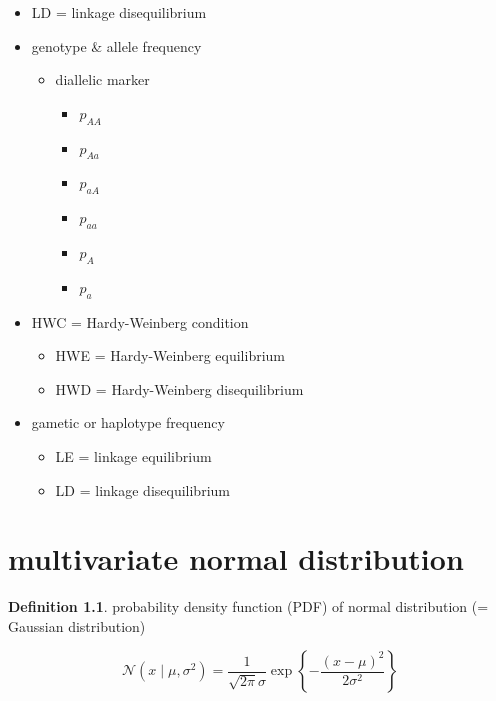 \documentclass[
]{book}
\providecommand{\tightlist}{%
  \setlength{\itemsep}{0pt}\setlength{\parskip}{0pt}}
\theoremstyle{definition}
\newtheorem{definition}{Definition}[chapter]
\theoremstyle{definition}
\theoremstyle{definition}
\theoremstyle{definition}
\theoremstyle{remark}
\begin{document}
\begin{itemize}
\tightlist
\item
  LD = linkage disequilibrium
\item
  genotype \& allele frequency

  \begin{itemize}
  \tightlist
  \item
    diallelic marker

    \begin{itemize}
    \tightlist
    \item
      \(p_{AA}\)
    \item
      \(p_{Aa}\)
    \item
      \(p_{aA}\)
    \item
      \(p_{aa}\)
    \item
      \(p_{A}\)
    \item
      \(p_{a}\)
    \end{itemize}
  \end{itemize}
\item
  HWC = Hardy-Weinberg condition

  \begin{itemize}
  \tightlist
  \item
    HWE = Hardy-Weinberg equilibrium
  \item
    HWD = Hardy-Weinberg disequilibrium
  \end{itemize}
\item
  gametic or haplotype frequency

  \begin{itemize}
  \tightlist
  \item
    LE = linkage equilibrium
  \item
    LD = linkage disequilibrium
  \end{itemize}
\end{itemize}

\chapter{multivariate normal distribution}\label{multivariate-normal-distribution}

\begin{definition}
\protect\hypertarget{def:unnamed-chunk-1}{}\label{def:unnamed-chunk-1}probability density function (PDF) of normal distribution (= Gaussian distribution)
\end{definition}

\[ 
\mathcal{N}\left(x \mid \mu, \sigma^2\right)=\frac{1}{\sqrt{2 \pi} \sigma} \exp \left\{-\frac{(x-\mu)^2}{2 \sigma^2}\right\}
\]
\end{document}
